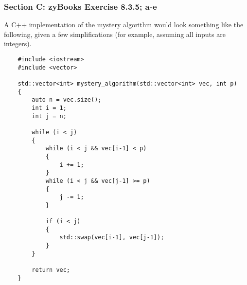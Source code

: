 \documentclass[14pt]{extreport}
\begin{document}
\subsubsection*{Section C: zyBooks Exercise 8.3.5; a-e}

A C++ implementation of the mystery algorithm would look something like the following, given a few simplifications (for example, assuming all inputs are integers). 

\begin{verbatim}
    #include <iostream>
    #include <vector>

    std::vector<int> mystery_algorithm(std::vector<int> vec, int p)
    {
        auto n = vec.size();
        int i = 1;
        int j = n;

        while (i < j)
        {
            while (i < j && vec[i-1] < p)
            {
                i += 1;
            }
            while (i < j && vec[j-1] >= p)
            {
                j -= 1;
            }
            
            if (i < j)
            {
                std::swap(vec[i-1], vec[j-1]);
            }
        }
        
        return vec;
    }
\end{verbatim}
\end{document}
